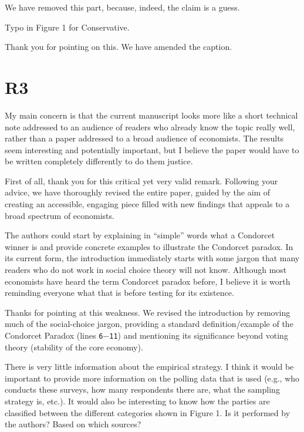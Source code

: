 \documentclass[a4paper, 12pt]{scrartcl}
\theoremstyle{break}
\newenvironment{changes}{\par\color{violet}\par\addvspace{\baselineskip}}{\par\addvspace{\baselineskip}}
\begin{document}
We have removed this part, because, indeed, the claim is a guess.

\begin{changes}
Typo in Figure 1 for Conservative.
\end{changes}
Thank you for pointing on this. We have amended the caption. 

\newpage
\section*{R3}
\begin{changes}
My main concern is that the current manuscript looks more like a short technical note addressed to an audience of readers who already know the topic really well, rather than a paper addressed to a broad audience of economists. The results seem interesting and potentially important, but I believe the paper would have to be written completely differently to do them justice.
\end{changes}

First of all, thank you for this critical yet very valid remark. Following your advice, we have thoroughly revised the entire paper, guided by the aim of creating an accessible, engaging piece filled with new findings that appeals to a broad spectrum of economists.

\begin{changes}
The authors could start by explaining in “simple” words what a Condorcet winner is and provide concrete examples to illustrate the Condorcet paradox. In its current form, the introduction immediately starts with some jargon that many readers who do not work in social choice theory will not know. Although most economists have heard the term Condorcet paradox before, I believe it is worth reminding everyone what that is before testing for its existence.
\end{changes}

Thanks for pointing at this weakness. We revised the introduction by removing much of the social-choice jargon, providing a standard definition/example of the Condorcet Paradox (lines \texttt{6$-$11}) and mentioning its significance beyond voting theory (stability of the core economy). 

\begin{changes}
There is very little information about the empirical strategy. I think it would be important to provide more information on the polling data that is used (e.g., who conducts these surveys, how many respondents there are, what the sampling strategy is, etc.). It would also be interesting to know how the parties are classified between the different categories shown in Figure 1. Is it performed by the authors? Based on which sources?
\end{changes}
\end{document}
